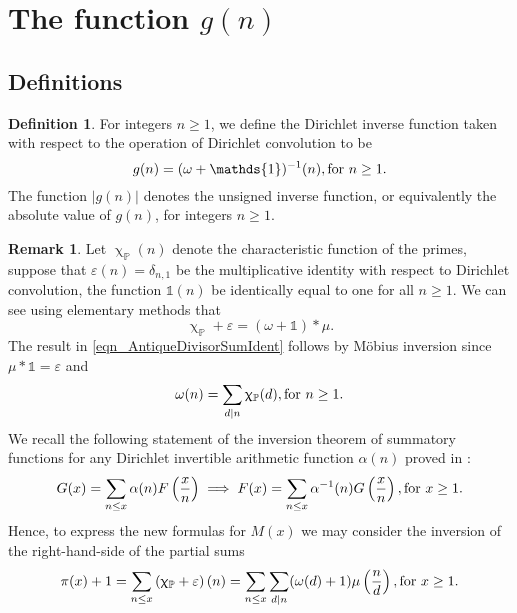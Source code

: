\documentclass[11pt,reqno,a4letter]{article}
\numberwithin{equation}{section}
\numberwithin{figure}{section}
\numberwithin{table}{section}
\renewcommand{\chi}{\upchi}
\theoremstyle{plain}
\numberwithin{theorem}{section}
\theoremstyle{definition}
\newtheorem{remark}[theorem]{Remark}
\newtheorem{definition}[theorem]{Definition}
\theoremstyle{remark}
\newcommand{\mathtext}[1]{\text{\rm #1}}
\begin{document}
\section{The function $g(n)$} 
\label{Section_NewFormulasForgInvn_v2} 

\subsection{Definitions}

\begin{definition}
\label{def_gn_and_Absgn_v2} 
For integers $n \geq 1$, we define the Dirichlet inverse function 
taken with respect to the operation of Dirichlet convolution to be 
\[
g(n) = (\omega + \mathds{1})^{-1}(n), \mathtext{ for } n \geq 1. 
\]
The function $|g(n)|$ denotes the unsigned inverse function, 
or equivalently the absolute value of $g(n)$, for integers $n \geq 1$. 
\end{definition}

\begin{remark} 
\label{remark_MotivationForTheDefinitionOf_gn_v2}
Let $\chi_{\mathbb{P}}(n)$ denote the characteristic function of the primes, suppose that 
$\varepsilon(n) = \delta_{n,1}$ be the multiplicative identity 
with respect to Dirichlet convolution, the function $\mathds{1}(n)$ be identically equal 
to one for all $n \geq 1$. 
We can see using elementary methods that 
\begin{equation}
\label{eqn_AntiqueDivisorSumIdent} 
\chi_{\mathbb{P}} + \varepsilon = (\omega + \mathds{1}) \ast \mu. 
\end{equation} 
The result in \eqref{eqn_AntiqueDivisorSumIdent} follows by M\"obius inversion 
since $\mu \ast \mathds{1} = \varepsilon$ and 
\[
\omega(n) = \sum_{d|n} \chi_{\mathbb{P}}(d), \mathtext{ for } n \geq 1. 
\]
We recall the following statement of the 
inversion theorem of summatory functions for any 
Dirichlet invertible arithmetic function $\alpha(n)$ 
proved in \cite[\S 2.14]{APOSTOLANUMT}:
\begin{equation}
\label{eqn_ApostolStmt_ClassicSummatoryFuncInvThm_v1} 
G(x) = \sum_{n \leq x} \alpha(n) F\left(\frac{x}{n}\right) \implies 
     F(x) = \sum_{n \leq x} \alpha^{-1}(n) G\left(\frac{x}{n}\right), 
     \mathtext{ for } x \geq 1. 
\end{equation}
Hence, to express the new formulas for $M(x)$ 
we may consider the inversion of the right-hand-side of the partial sums 
\[
\pi(x) + 1 = \sum_{n \leq x} \left(\chi_{\mathbb{P}} + \varepsilon\right)(n) = 
     \sum_{n \leq x} \sum_{d|n} (\omega(d) + 1) \mu\left(\frac{n}{d}\right), 
	\mathtext{ for } x \geq 1. 
\]
\end{remark}
\end{document}
